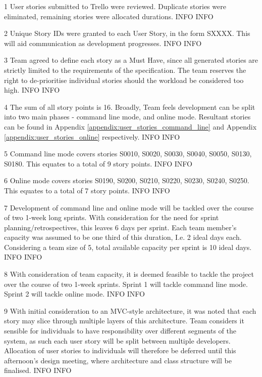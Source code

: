 \begin{momitems}
	\momitem
	{1}
	{User stories submitted to Trello were reviewed. 
	Duplicate stories were eliminated, remaining stories were allocated durations.}
	{INFO}
	{INFO}
	
	\momitem
	{2}
	{Unique Story IDs were granted to each User Story, in the form SXXXX. 
	This will aid communication as development progresses.}
	{INFO}
	{INFO}

	\momitem
	{3}
	{Team agreed to define each story as a Must Have, since all generated stories are strictly limited to the requirements of the specification. 
	The team reserves the right to de-prioritise individual stories should the workload be considered too high.}
	{INFO}
	{INFO}

	\momitem
	{4}
	{The sum of all story points is 16. Broadly, Team feels development can be split into two main phases - command line mode, and online mode. 
	Resultant stories can be found in Appendix \ref{appendix:user_stories_command_line} and Appendix \ref{appendix:user_stories_online} respectively.}
	{INFO}
	{INFO}

	\momitem
	{5}
	{Command line mode covers stories S0010, S0020, S0030, S0040, S0050, S0130, S0180. 
	This equates to a total of 9 story points.}
	{INFO}
	{INFO}

	\momitem
	{6}
	{Online mode covers stories S0190, S0200, S0210, S0220, S0230, S0240, S0250. 
	This equates to a total of 7 story points.}
	{INFO}
	{INFO}

	\momitem
	{7}
	{Development of command line and online mode will be tackled over the course of two 1-week long sprints. 
	With consideration for the need for sprint planning/retrospectives, this leaves 6 days per sprint. 
	Each team member's capacity was assumed to be one third of this duration, I.e. 2 ideal days each. 
	Considering a team size of 5, total available capacity per sprint is 10 ideal days.}
	{INFO}
	{INFO}

	\momitem
	{8}
	{With consideration of team capacity, it is deemed feasible to tackle the project over the course of two 1-week sprints. 
	Sprint 1 will tackle command line mode. 
	Sprint 2 will tackle online mode.}
	{INFO}
	{INFO}

	\momitem
	{9}
	{With initial consideration to an MVC-style architecture, it was noted that each story may slice through multiple layers of this architecture.
	Team considers it sensible for individuals to have responsibility over different segments of the system, as such each user story will be split between multiple developers. 
	Allocation of user stories to individuals will therefore be deferred until this afternoon's design meeting, where architecture and class structure will be finalised.}
	{INFO}
	{INFO}


\end{momitems}
